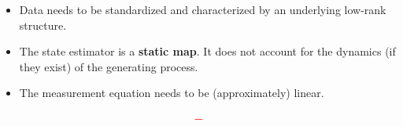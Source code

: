 \documentclass[aspectratio=169, usenames, dvipsnames]{beamer}
\begin{document}
\begin{frame}
  \vfill

  \begin{minipage}{.68\textwidth}
    \begin{itemize}
      \item Data needs to be standardized and characterized by an underlying low-rank structure.

      \bigskip

      \item The state estimator is a \textbf{static map}.
      It does not account for the dynamics (if they exist) of the generating process.

      \bigskip

      \item The measurement equation needs to be (approximately) linear.

    \end{itemize}
  \end{minipage}%
  \hfill
  \begin{minipage}{.28\textwidth}
    \centering
    \Huge
    \[
    \color{red} \bm{-}
    \]
  \end{minipage}

  \vfill
\end{frame}
\end{document}
